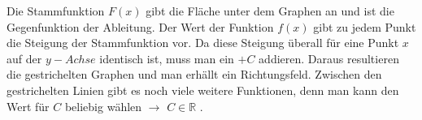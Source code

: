 \documentclass[a4paper,11pt]{report}
\begin{document}
Die Stammfunktion $F(x)$ gibt die Fläche unter dem Graphen an und ist die Gegenfunktion der Ableitung. Der Wert der Funktion $f(x)$ gibt zu jedem Punkt die Steigung der Stammfunktion vor.
Da diese Steigung überall für eine Punkt $x$ auf der $y-Achse$ identisch ist, muss man ein $+C$ addieren. Daraus resultieren die gestrichelten Graphen und man erhällt ein Richtungsfeld.
Zwischen den gestrichelten Linien gibt es noch viele weitere Funktionen, denn man kann den Wert für $C$ beliebig wählen $\rightarrow$ $C \in \mathbb{R}$ .
\end{document}
